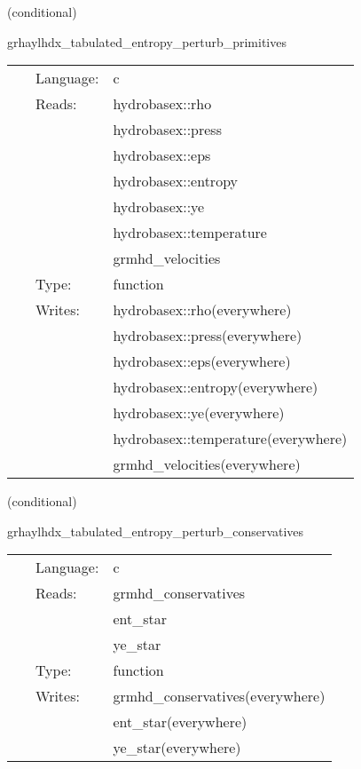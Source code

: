 \vspace{5mm}

   (conditional) 

\hspace{5mm} grhaylhdx\_tabulated\_entropy\_perturb\_primitives 

\hspace{5mm}{\it entropy+tabulated version of grhaylhdx\_perturb\_primitives } 


\hspace{5mm}

 \begin{tabular*}{160mm}{cll} 
~ & Language:  & c \\ 
~ & Reads:  & hydrobasex::rho \\ 
~& ~ &hydrobasex::press\\ 
~& ~ &hydrobasex::eps\\ 
~& ~ &hydrobasex::entropy\\ 
~& ~ &hydrobasex::ye\\ 
~& ~ &hydrobasex::temperature\\ 
~& ~ &grmhd\_velocities\\ 
~ & Type:  & function \\ 
~ & Writes:  & hydrobasex::rho(everywhere) \\ 
~& ~ &hydrobasex::press(everywhere)\\ 
~& ~ &hydrobasex::eps(everywhere)\\ 
~& ~ &hydrobasex::entropy(everywhere)\\ 
~& ~ &hydrobasex::ye(everywhere)\\ 
~& ~ &hydrobasex::temperature(everywhere)\\ 
~& ~ &grmhd\_velocities(everywhere)\\ 
\end{tabular*} 


\vspace{5mm}

   (conditional) 

\hspace{5mm} grhaylhdx\_tabulated\_entropy\_perturb\_conservatives 

\hspace{5mm}{\it entropy+tabulated version of grhaylhdx\_perturb\_conservatives } 


\hspace{5mm}

 \begin{tabular*}{160mm}{cll} 
~ & Language:  & c \\ 
~ & Reads:  & grmhd\_conservatives \\ 
~& ~ &ent\_star\\ 
~& ~ &ye\_star\\ 
~ & Type:  & function \\ 
~ & Writes:  & grmhd\_conservatives(everywhere) \\ 
~& ~ &ent\_star(everywhere)\\ 
~& ~ &ye\_star(everywhere)\\ 
\end{tabular*} 


